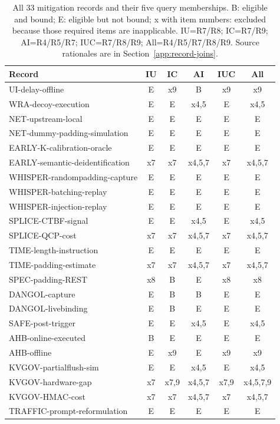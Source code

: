 \clearpage
\begin{table}[ht]\centering\small
\caption{All 33 mitigation records and their five query memberships. B: eligible and bound; E: eligible but not bound; x with item numbers: excluded because those required items are inapplicable. IU=R7/R8; IC=R7/R9; AI=R4/R5/R7; IUC=R7/R8/R9; All=R4/R5/R7/R8/R9. Source rationales are in Section~\ref{app:record-joins}.}\label{tab:r25-membership}
\begin{tabular}{@{}lccccc@{}}\toprule
Record & IU & IC & AI & IUC & All\\\midrule
UI-delay-offline & E & x9 & B & x9 & x9\\
WRA-decoy-execution & E & E & x4,5 & E & x4,5\\
NET-upstream-local & E & E & E & E & E\\
NET-dummy-padding-simulation & E & E & E & E & E\\
EARLY-K-calibration-oracle & E & E & E & E & E\\
EARLY-semantic-deidentification & x7 & x7 & x4,5,7 & x7 & x4,5,7\\
WHISPER-randompadding-capture & E & E & E & E & E\\
WHISPER-batching-replay & E & E & E & E & E\\
WHISPER-injection-replay & E & E & E & E & E\\
SPLICE-CTBF-signal & E & E & x4,5 & E & x4,5\\
SPLICE-QCP-cost & x7 & x7 & x4,5,7 & x7 & x4,5,7\\
TIME-length-instruction & E & E & E & E & E\\
TIME-padding-estimate & x7 & x7 & x4,5,7 & x7 & x4,5,7\\
SPEC-padding-REST & x8 & B & E & x8 & x8\\
DANGOL-capture & E & B & B & E & E\\
DANGOL-livebinding & E & B & E & E & E\\
SAFE-post-trigger & E & E & x4,5 & E & x4,5\\
AHB-online-executed & B & E & E & E & E\\
AHB-offline & E & x9 & E & x9 & x9\\
KVGOV-partialflush-sim & E & E & x4,5 & E & x4,5\\
KVGOV-hardware-gap & x7 & x7,9 & x4,5,7 & x7,9 & x4,5,7,9\\
KVGOV-HMAC-cost & x7 & x7 & x4,5,7 & x7 & x4,5,7\\
TRAFFIC-prompt-reformulation & E & E & E & E & E\\

\end{tabular}
\end{table}
